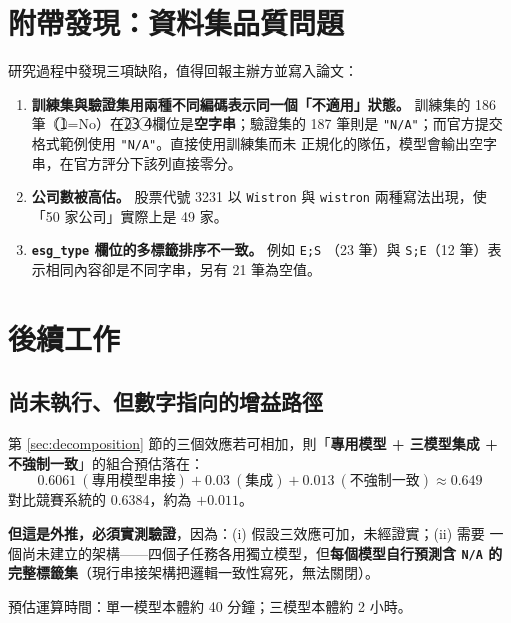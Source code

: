 \documentclass[11pt,a4paper]{ctexart}
\newcommand{\fieldname}[1]{\texttt{#1}}
\begin{document}
\section{附帶發現：資料集品質問題}

研究過程中發現三項缺陷，值得回報主辦方並寫入論文：

\begin{enumerate}[leftmargin=2em, itemsep=4pt]
  \item \textbf{訓練集與驗證集用兩種不同編碼表示同一個「不適用」狀態。}
        訓練集的 186 筆（\textcircled{1}=No）在\textcircled{2}\textcircled{3}
        \textcircled{4}欄位是\textbf{空字串}；驗證集的 187 筆則是
        \texttt{"N/A"}；而官方提交格式範例使用 \texttt{"N/A"}。直接使用訓練集而未
        正規化的隊伍，模型會輸出空字串，在官方評分下該列直接零分。
  \item \textbf{公司數被高估。} 股票代號 3231 以 \texttt{Wistron} 與
        \texttt{wistron} 兩種寫法出現，使「50 家公司」實際上是 49 家。
  \item \textbf{\fieldname{esg\_type} 欄位的多標籤排序不一致。} 例如 \texttt{E;S}
        （23 筆）與 \texttt{S;E}（12 筆）表示相同內容卻是不同字串，另有 21 筆為空值。
\end{enumerate}

\section{後續工作}

\subsection{尚未執行、但數字指向的增益路徑}

第 \ref{sec:decomposition} 節的三個效應若可相加，則「\textbf{專用模型 + 三模型集成
+ 不強制一致}」的組合預估落在：
\[
0.6061\ (\text{專用模型串接}) + 0.03\ (\text{集成}) + 0.013\ (\text{不強制一致})
\approx \mathbf{0.649}
\]
對比競賽系統的 0.6384，約為 \textbf{$+0.011$}。

\textbf{但這是外推，必須實測驗證}，因為：(i) 假設三效應可加，未經證實；(ii) 需要
一個尚未建立的架構——四個子任務各用獨立模型，但\textbf{每個模型自行預測含
\fieldname{N/A} 的完整標籤集}（現行串接架構把邏輯一致性寫死，無法關閉）。

預估運算時間：單一模型本體約 40 分鐘；三模型本體約 2 小時。
\end{document}
